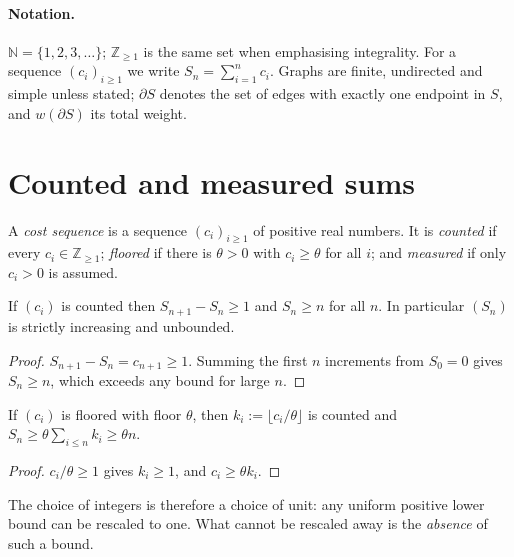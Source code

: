 \documentclass[10pt,twocolumn,a4paper]{article}
\newcommand{\N}{\mathbb{N}}
\newcommand{\Z}{\mathbb{Z}}
\newcommand{\cut}{\partial}
\begin{document}
\paragraph{Notation.}
$\N=\{1,2,3,\dots\}$; $\Z_{\ge 1}$ is the same set when emphasising
integrality. For a sequence $(c_i)_{i\ge1}$ we write $S_n=\sum_{i=1}^n c_i$.
Graphs are finite, undirected and simple unless stated; $\cut S$ denotes the
set of edges with exactly one endpoint in $S$, and $w(\cut S)$ its total
weight.

\section{Counted and measured sums}
\label{sec:sums}

\begin{definition}
\label{def:costs}
A \emph{cost sequence} is a sequence $(c_i)_{i\ge1}$ of positive real numbers.
It is \emph{counted} if every $c_i\in\Z_{\ge1}$; \emph{floored} if there is
$\theta>0$ with $c_i\ge\theta$ for all $i$; and \emph{measured} if only
$c_i>0$ is assumed.
\end{definition}

\begin{lemma}
\label{lem:counted}
If $(c_i)$ is counted then $S_{n+1}-S_n\ge1$ and $S_n\ge n$ for all $n$. In
particular $(S_n)$ is strictly increasing and unbounded.
\end{lemma}

\begin{proof}
$S_{n+1}-S_n=c_{n+1}\ge1$. Summing the first $n$ increments from $S_0=0$
gives $S_n\ge n$, which exceeds any bound for large $n$.
\end{proof}

\begin{proposition}
\label{prop:floored}
If $(c_i)$ is floored with floor $\theta$, then $k_i:=\lfloor c_i/\theta\rfloor$
is counted and $S_n\ge\theta\sum_{i\le n}k_i\ge\theta n$.
\end{proposition}

\begin{proof}
$c_i/\theta\ge1$ gives $k_i\ge1$, and $c_i\ge\theta k_i$.
\end{proof}

The choice of integers is therefore a choice of unit: any uniform positive
lower bound can be rescaled to one. What cannot be rescaled away is the
\emph{absence} of such a bound.
\end{document}
